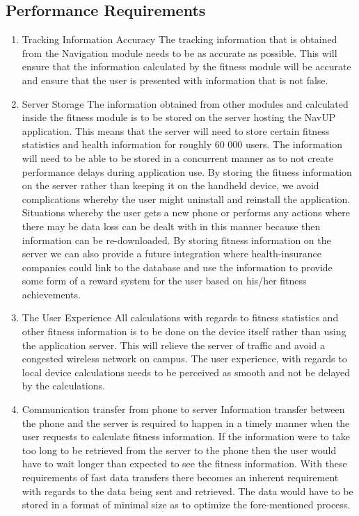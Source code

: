 \subsection{Performance Requirements}
\begin{enumerate}
	\item Tracking Information Accuracy
	\newline
	The tracking information that is obtained from the Navigation module needs to be as accurate as possible. This will ensure that the information calculated by the fitness module will be accurate and ensure that the user is presented with information that is not false.
	\item Server Storage
	\newline
	The information obtained from other modules and calculated inside the fitness module is to be stored on the server hosting the NavUP application. This means that the server will need to store certain fitness statistics and health information for roughly 60 000 users. The information will need to be able to be stored in a concurrent manner as to not create performance delays during application use.
	\newline
	By storing the fitness information on the server rather than keeping it on the handheld device, we avoid complications whereby the user might uninstall and reinstall the application. Situations whereby the user gets a new phone or performs any actions where there may be data loss can be dealt with in this manner because then information can be re-downloaded.  
	\newline
	By storing fitness information on the server we can also provide a future integration where health-insurance companies could link to the database and use the information to provide some form of a reward system for the user based on his/her fitness achievements.  
	
	\item The User Experience 
	\newline
	All calculations with regards to fitness statistics and other fitness information is to be done on the device itself rather than using the application server. This will relieve the server of traffic and avoid a congested wireless network on campus. The user experience, with regards to local device calculations needs to be perceived as smooth and not be delayed by the calculations.
	
	\item Communication transfer from phone to server
	\newline
	Information transfer between the phone and the server is required to happen in a timely manner when the user requests to calculate fitness information. If the information were to take too long to be retrieved from the server to the phone then the user would have to wait longer than expected to see the fitness information.
	\newline
	With these requirements of fast data transfers there becomes an inherent requirement with regards to the data being sent and retrieved. The data would have to be stored in a format of minimal size as to optimize the fore-mentioned process.
	

\end{enumerate}
